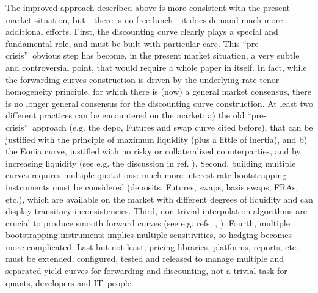 \documentclass[11pt,reqno]{amsart}
\begin{document}
The improved approach described above is more consistent with the present market situation, but - there is no free lunch - it does demand much more additional efforts. First, the discounting curve clearly plays a special and fundamental role, and must be built with particular care. This \textquotedblleft pre-crisis\textquotedblright\ obvious step has become, in the present market situation, a very subtle and controversial point, that would require a whole paper in itself. In fact, while the forwarding curves construction is driven by the underlying rate tenor homogeneity principle, for which there is (now) a general market consensus, there is no longer general consensus for the discounting curve construction. At least two different practices can be encountered on the market: a) the old
\textquotedblleft pre-crisis\textquotedblright\ approach (e.g. the depo, Futures and swap curve cited before), that can be justified with the principle of maximum liquidity (plus a little of inertia), and b) the Eonia curve, justified with no risky or collateralized counterparties, and by increasing liquidity (see e.g. the discussion in ref. \cite{Mad08}).
Second, building multiple curves requires multiple quotations: much more interest rate bootstrapping instruments must be considered (deposits, Futures, swaps, basis swaps, FRAs, etc.), which are available on the market with different degrees of liquidity and can display transitory inconsistencies.
Third, non trivial interpolation algorithms are crucial to produce smooth forward curves (see e.g. refs. \cite{HagWes08}, \cite{And07}).
Fourth, multiple bootstrapping instruments implies multiple sensitivities, so hedging becomes more complicated. Last but not least, pricing libraries, platforms, reports, etc. must be extended, configured, tested and released to manage multiple and separated yield curves for forwarding and discounting, not a trivial task for quants, developers and IT\ people.
\end{document}
